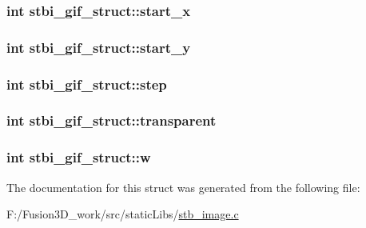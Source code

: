 \subsubsection[{start\+\_\+x}]{\setlength{\rightskip}{0pt plus 5cm}int stbi\+\_\+gif\+\_\+struct\+::start\+\_\+x}\label{structstbi__gif__struct_ad3899ad3323686e963a7322e9a80bb05}
\hypertarget{structstbi__gif__struct_a7f4974b80d6e6f4f56b5fd02a9c1c121}{}
\subsubsection[{start\+\_\+y}]{\setlength{\rightskip}{0pt plus 5cm}int stbi\+\_\+gif\+\_\+struct\+::start\+\_\+y}\label{structstbi__gif__struct_a7f4974b80d6e6f4f56b5fd02a9c1c121}
\hypertarget{structstbi__gif__struct_a61556e0a3ff8f19fa80401de5da1f079}{}
\subsubsection[{step}]{\setlength{\rightskip}{0pt plus 5cm}int stbi\+\_\+gif\+\_\+struct\+::step}\label{structstbi__gif__struct_a61556e0a3ff8f19fa80401de5da1f079}
\hypertarget{structstbi__gif__struct_ab46e0fb6ad50c3caeac8800ef07b78a8}{}
\subsubsection[{transparent}]{\setlength{\rightskip}{0pt plus 5cm}int stbi\+\_\+gif\+\_\+struct\+::transparent}\label{structstbi__gif__struct_ab46e0fb6ad50c3caeac8800ef07b78a8}
\hypertarget{structstbi__gif__struct_a28e5c2fb704a64d23a7e8f9013ecda34}{}
\subsubsection[{w}]{\setlength{\rightskip}{0pt plus 5cm}int stbi\+\_\+gif\+\_\+struct\+::w}\label{structstbi__gif__struct_a28e5c2fb704a64d23a7e8f9013ecda34}


The documentation for this struct was generated from the following file\+:\begin{DoxyCompactItemize}
\item 
F\+:/\+Fusion3\+D\+\_\+work/src/static\+Libs/\hyperlink{stb__image_8c}{stb\+\_\+image.\+c}\end{DoxyCompactItemize}
